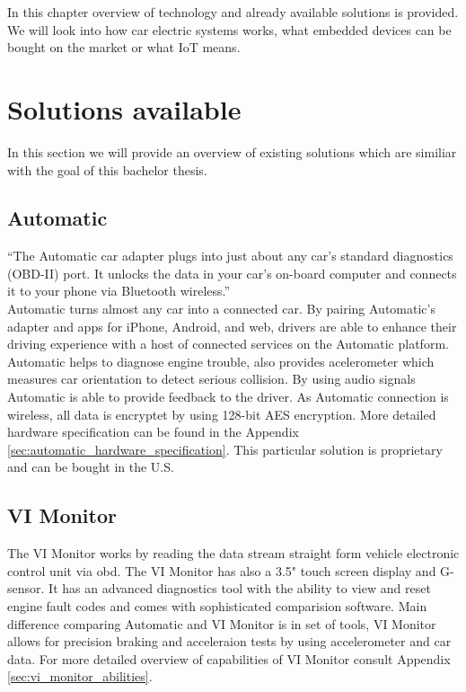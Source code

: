 In this chapter overview of technology and already available solutions is provided. We will look into how car electric systems works, what embedded devices can be bought on the market or what IoT means.
\section{Solutions available}
In this section we will provide an overview of existing solutions which are similiar with the goal of this bachelor thesis.
\subsection{Automatic}
``The Automatic car adapter plugs into just about any car’s standard diagnostics (OBD-II) port. It unlocks the data in your car’s on-board computer and connects it to your phone via Bluetooth wireless.''\cite{automatic_how}\\
Automatic turns almost any car into a connected car. By pairing Automatic’s adapter and apps for iPhone, Android, and web, drivers are able to enhance their driving experience with a host of connected services on the Automatic platform. Automatic helps to diagnose engine trouble, also provides acelerometer which measures car orientation to detect serious collision. By using audio signals Automatic is able to provide feedback to the driver. As Automatic connection is wireless, all data is encryptet by using 128-bit AES encryption.\cite{automatic_press} More detailed hardware specification can be found in the Appendix \ref{sec:automatic_hardware_specification}. This particular solution is proprietary and can be bought in the U.S.


\subsection{VI Monitor}
The VI Monitor works by reading the data stream straight form vehicle electronic control unit via \gls{obd}. The VI Monitor has also a 3.5" touch screen display and G-sensor. It has an advanced diagnostics tool with the ability to view and reset engine fault codes and comes with sophisticated comparision software. Main difference comparing Automatic and VI Monitor is in set of tools, VI Monitor allows for precision braking and acceleraion tests by using accelerometer and car data.\cite{vi_features} For more detailed overview of capabilities of VI Monitor consult Appendix \ref{sec:vi_monitor_abilities}.


